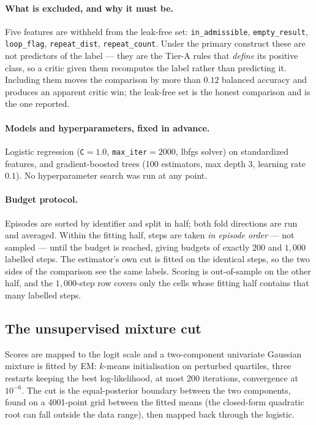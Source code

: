 \paragraph{What is excluded, and why it must be.} Five features are withheld from
the leak-free set: \texttt{in\_admissible}, \texttt{empty\_result},
\texttt{loop\_flag}, \texttt{repeat\_dist}, \texttt{repeat\_count}. Under the
primary construct these are not predictors of the label --- they are the Tier-A
rules that \emph{define} its positive class, so a critic given them recomputes the
label rather than predicting it. Including them moves the comparison by more than
$0.12$ balanced accuracy and produces an apparent critic win; the leak-free set is
the honest comparison and is the one reported.

\paragraph{Models and hyperparameters, fixed in advance.} Logistic regression
(\texttt{C}$=1.0$, \texttt{max\_iter}$=2000$, lbfgs solver) on standardized
features, and gradient-boosted trees (100 estimators, max depth 3, learning rate
$0.1$). No hyperparameter search was run at any point.

\paragraph{Budget protocol.} Episodes are sorted by identifier and split in half;
both fold directions are run and averaged. Within the fitting half, steps are
taken \emph{in episode order} --- not sampled --- until the budget is reached,
giving budgets of exactly $200$ and $1{,}000$ labelled steps. The estimator's own
cut is fitted on the identical steps, so the two sides of the comparison see the
same labels. Scoring is out-of-sample on the other half, and the $1{,}000$-step
row covers only the cells whose fitting half contains that many labelled steps.

\subsection{The unsupervised mixture cut}\label{app:methods:mixture}

Scores are mapped to the logit scale and a two-component univariate Gaussian
mixture is fitted by EM: $k$-means initialisation on perturbed quartiles, three
restarts keeping the best log-likelihood, at most 200 iterations, convergence at
$10^{-6}$. The cut is the equal-posterior boundary between the two components,
found on a 4001-point grid between the fitted means (the closed-form quadratic
root can fall outside the data range), then mapped back through the logistic.

